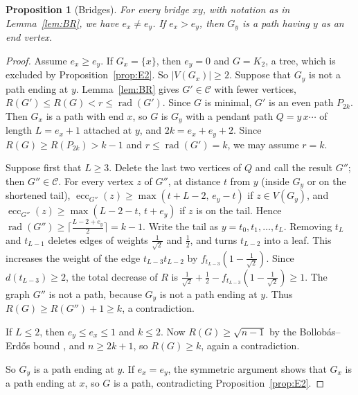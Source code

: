 \documentclass[11pt,a4paper]{article}
\newtheorem{proposition}[theorem]{Proposition}
\theoremstyle{definition}
\newcommand{\rad}{\operatorname{rad}}
\newcommand{\ecc}{\operatorname{ecc}}
\newcommand{\C}{\mathcal{C}}
\begin{document}
\begin{proposition}[Bridges]\label{prop:bridges}
For every bridge $xy$, with notation as in Lemma~\ref{lem:BR}, we have $e_x\ne e_y$. If $e_x>e_y$, then $G_y$ is a path having $y$ as an end vertex.
\end{proposition}
\begin{proof}
Assume $e_x\ge e_y$. If $G_x=\{x\}$, then $e_y=0$ and $G=K_2$, a tree, which is excluded by Proposition~\ref{prop:E2}. So $|V(G_x)|\ge2$. Suppose that $G_y$ is not a path ending at $y$. Lemma~\ref{lem:BR} gives $G'\in\C$ with fewer vertices, $R(G')\le R(G)<r\le\rad(G')$. Since $G$ is minimal, $G'$ is an even path $P_{2k}$. Then $G_x$ is a path with end $x$, so $G$ is $G_y$ with a pendant path $Q=y\,x\cdots$ of length $L=e_x+1$ attached at $y$, and $2k=e_x+e_y+2$. Since $R(G)\ge R(P_{2k})>k-1$ and $r\le\rad(G')=k$, we may assume $r=k$.

Suppose first that $L\ge3$. Delete the last two vertices of $Q$ and call the result $G''$; then $G''\in\C$. For every vertex $z$ of $G''$, at distance $t$ from $y$ (inside $G_y$ or on the shortened tail), $\ecc_{G''}(z)\ge\max(t+L-2,\,e_y-t)$ if $z\in V(G_y)$, and $\ecc_{G''}(z)\ge\max(L-2-t,\,t+e_y)$ if $z$ is on the tail. Hence $\rad(G'')\ge\lceil\frac{L-2+e_y}2\rceil=k-1$. Write the tail as $y=t_0,t_1,\dots,t_L$. Removing $t_L$ and $t_{L-1}$ deletes edges of weights $\frac1{\sqrt2}$ and $\frac12$, and turns $t_{L-2}$ into a leaf. This increases the weight of the edge $t_{L-3}t_{L-2}$ by $f_{t_{L-3}}(1-\frac1{\sqrt2})$. Since $d(t_{L-3})\ge2$, the total decrease of $R$ is $\frac1{\sqrt2}+\frac12-f_{t_{L-3}}(1-\frac1{\sqrt2})\ge1$. The graph $G''$ is not a path, because $G_y$ is not a path ending at $y$. Thus $R(G)\ge R(G'')+1\ge k$, a contradiction.

If $L\le2$, then $e_y\le e_x\le1$ and $k\le2$. Now $R(G)\ge\sqrt{n-1}$ by the Bollob\'as--Erd\H{o}s bound \cite{BollobasErdos}, and $n\ge2k+1$, so $R(G)\ge k$, again a contradiction.

So $G_y$ is a path ending at $y$. If $e_x=e_y$, the symmetric argument shows that $G_x$ is a path ending at $x$, so $G$ is a path, contradicting Proposition~\ref{prop:E2}.
\end{proof}
\end{document}
